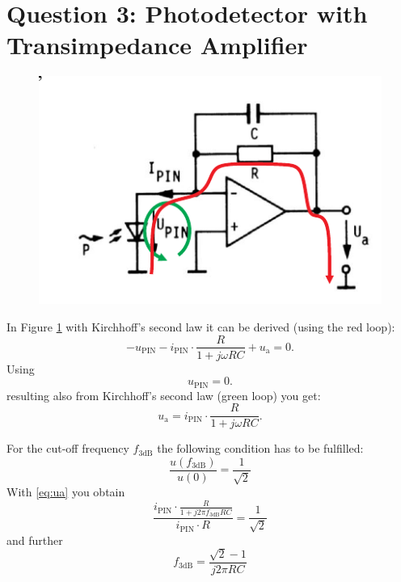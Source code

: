 \section{Question 3: Photodetector with Transimpedance Amplifier}

\begin{figure}[h]%
\centering
\includegraphics[width=.8\columnwidth]{Grafiken/OPAMP_m.pdf}
\caption{}%
\label{fig:OPAMP}%

\end{figure}

In Figure \ref{fig:OPAMP} with Kirchhoff's second law it can be derived (using the red loop):
\begin{equation}
 - u_{\mathrm{PIN}} - i_{\mathrm{PIN}}\cdot \frac{R}{1+ j\omega RC}+u_{\mathrm{a}} = 0 .
\label{eq:masche1}
\end{equation}
Using
\begin{equation}
 u_{\mathrm{PIN}}=0.
\label{eq:masche2}
\end{equation}
resulting also from Kirchhoff's second law (green loop) you get:
\begin{equation}
 u_{\mathrm{a}} = i_{\mathrm{PIN}}\cdot \frac{R}{1+ j\omega RC}.
\label{eq:ua}
\end{equation}

For the cut-off frequency $f_{\mathrm{3dB}}$ the following condition has to be fulfilled:
\begin{equation}
 \frac{u(f_{\mathrm{3dB}})}{u(0)} = \frac{1}{\sqrt{2}}
\end{equation}
With \eqref{eq:ua} you obtain
\begin{equation}
 \frac{i_{\mathrm{PIN}}\cdot \frac{R}{1+ j2\pi f_{\mathrm{3dB}} RC}}{i_{\mathrm{PIN}}\cdot R} = \frac{1}{\sqrt{2}}
\end{equation}
and further
\begin{equation}
 f_{\mathrm{3dB}} = \frac{\sqrt{2}-1}{j2\pi RC} 
\end{equation}

